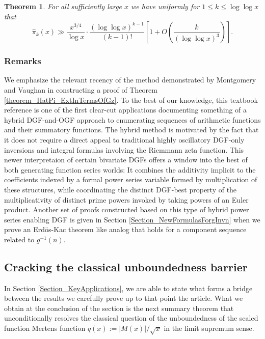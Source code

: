 \documentclass[11pt,reqno,a4letter]{article}
\numberwithin{figure}{section}
\numberwithin{table}{section}
\theoremstyle{plain}
\newtheorem{theorem}{Theorem}
\numberwithin{theorem}{section}
\theoremstyle{definition}
\begin{document}
\begin{theorem} 
\label{theorem_GFs_SymmFuncs_SumsOfRecipOfPowsOfPrimes} 
\label{cor_BoundsOnGz_FromMVBook_initial_stmt_v1} 
For all sufficiently large $x$ we have uniformly for $1 \leq k \leq \log\log x$ that 
\[
\widehat{\pi}_k(x) \gg 
     \frac{x^{3/4}}{\log x} \cdot 
     \frac{(\log\log x)^{k-1}}{(k-1)!} \left[1 + 
     O\left(\frac{k}{(\log\log x)^3}\right)\right]. 
\]
\end{theorem} 

\subsubsection{Remarks} 

We emphasize the relevant recency of the method demonstrated by 
Montgomery and Vaughan in constructing a proof of 
Theorem \ref{theorem_HatPi_ExtInTermsOfGz}. 
To the best of our knowledge, this textbook reference is 
one of the first clear-cut applications documenting something of a hybrid 
DGF-and-OGF approach to enumerating sequences of arithmetic functions 
and their summatory functions. The hybrid method is motivated by the fact that it 
does not require a direct appeal to 
traditional highly oscillatory DGF-only inversions and integral formulas 
involving the Riemmann zeta function. 
This newer interpretaion of certain bivariate DGFs 
offers a window into the best of both generating function series worlds: 
It combines the additivity 
implicit to the coefficients indexed by a formal power series variable formed by 
multiplication of these structures, while coordinating the distinct DGF-best 
property of the multiplicativity of distinct prime powers invoked 
by taking powers of an Euler product. 
Another set of proofs constructed based on this type of hybrid power series enabling 
DGF is given in Section \ref{Section_NewFormulasForgInvn} 
when we prove an Erd\"os-Kac theorem like analog 
that holds for a component sequence related to $g^{-1}(n)$. 

\subsection{Cracking the classical unboundedness barrier} 

In Section \ref{Section_KeyApplications}, 
we are able to state what forms a bridge between the results 
we carefully prove up to that point the article. 
What we obtain at the conclusion of the section 
is the next summary theorem that unconditionally 
resolves the classical question of the 
unboundedness of the scaled function Mertens function 
$q(x) := |M(x)| / \sqrt{x}$ in the limit supremum sense. 
\end{document}
